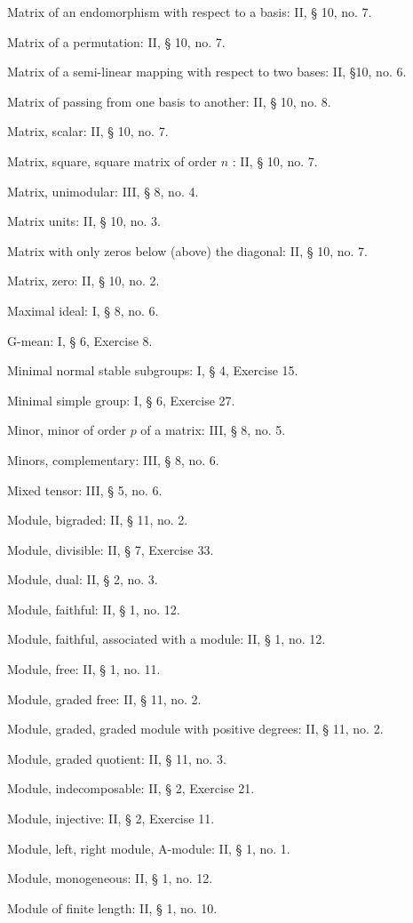 Matrix of an endomorphism with respect to a basis: II, § 10, no. 7.

Matrix of a permutation: II, § 10, no. 7.

Matrix of a semi-linear mapping with respect to two bases: II, §10, no. 6.

Matrix of passing from one basis to another: II, § 10, no. 8.

Matrix, scalar: II, § 10, no. 7.

Matrix, square, square matrix of order \(n\) : II, § 10, no. 7.

Matrix, unimodular: III, § 8, no. 4.

Matrix units: II, § 10, no. 3.

Matrix with only zeros below (above) the diagonal: II, § 10, no. 7.

Matrix, zero: II, § 10, no. 2.

Maximal ideal: I, § 8, no. 6.

G-mean: I, § 6, Exercise 8.

Minimal normal stable subgroups: I, § 4, Exercise 15.

Minimal simple group: I, § 6, Exercise 27.

Minor, minor of order \(p\) of a matrix: III, § 8, no. 5.

Minors, complementary: III, § 8, no. 6.

Mixed tensor: III, § 5, no. 6.

Module, bigraded: II, § 11, no. 2.

Module, divisible: II, § 7, Exercise 33.

Module, dual: II, § 2, no. 3.

Module, faithful: II, § 1, no. 12.

Module, faithful, associated with a module: II, § 1, no. 12.

Module, free: II, § 1, no. 11.

Module, graded free: II, § 11, no. 2.

Module, graded, graded module with positive degrees: II, § 11, no. 2.

Module, graded quotient: II, § 11, no. 3.

Module, indecomposable: II, § 2, Exercise 21.

Module, injective: II, § 2, Exercise 11.

Module, left, right module, A-module: II, § 1, no. 1.

Module, monogeneous: II, § 1, no. 12.

Module of finite length: II, § 1, no. 10.

